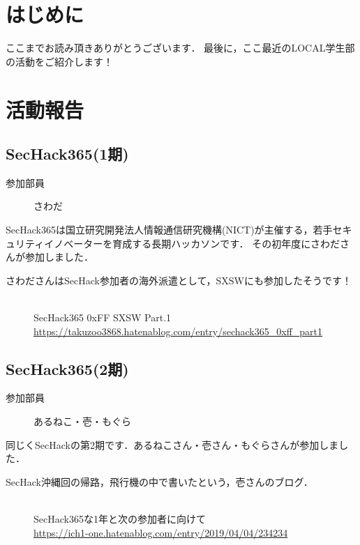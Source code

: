 \section{はじめに}
ここまでお読み頂きありがとうございます．
最後に，ここ最近のLOCAL学生部の活動をご紹介します！

\section{活動報告}
\subsection{SecHack365(1期)}
\begin{description}
\item[参加部員] さわだ
\end{description}

SecHack365は国立研究開発法人情報通信研究機構(NICT)が主催する，若手セキュリティイノベーターを育成する長期ハッカソンです．
その初年度にさわださんが参加しました．\mbox{}\\

\begin{description}
\item[さわださんはSecHack参加者の海外派遣として，SXSWにも参加したそうです！]\mbox{}\\
SecHack365 0xFF SXSW Part.1\mbox{}\\
\url{https://takuzoo3868.hatenablog.com/entry/sechack365_0xff_part1}
\end{description}

\subsection{SecHack365(2期)}
\begin{description}
\item[参加部員] あるねこ・壱・もぐら
\end{description}

同じくSecHackの第2期です．あるねこさん・壱さん・もぐらさんが参加しました．\mbox{}\\

\begin{description}
\item[SecHack沖縄回の帰路，飛行機の中で書いたという，壱さんのブログ．]\mbox{}\\
SecHack365な1年と次の参加者に向けて\mbox{}\\
\url{https://ich1-one.hatenablog.com/entry/2019/04/04/234234}
\end{description}

